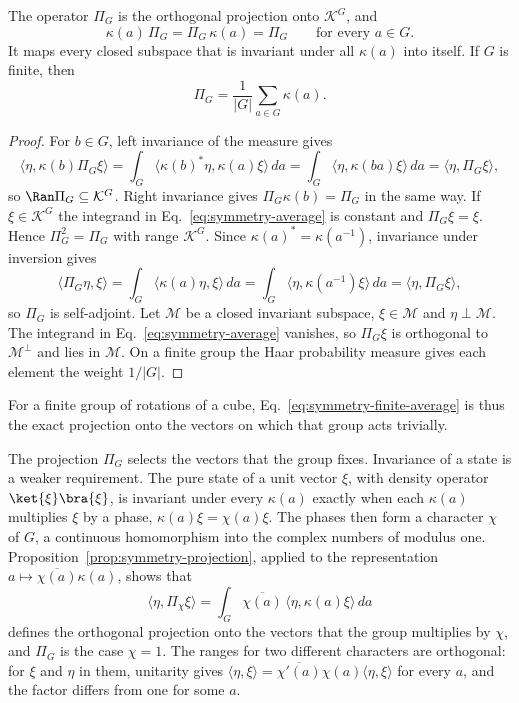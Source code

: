 \begin{proposition}
\label{prop:symmetry-projection}
The operator $\Pi_G$ is the orthogonal projection onto $\mathcal K^G$, and
\begin{equation}
 \kappa(a)\,\Pi_G=\Pi_G\,\kappa(a)=\Pi_G\qquad\text{for every }a\in G .
 \label{eq:symmetry-absorption}
\end{equation}
It maps every closed subspace that is invariant under all $\kappa(a)$ into itself. If $G$ is finite, then
\begin{equation}
 \Pi_G=\frac1{|G|}\sum_{a\in G}\kappa(a).
 \label{eq:symmetry-finite-average}
\end{equation}
\end{proposition}
\begin{proof}
For $b\in G$, left invariance of the measure gives
\[
 \langle\eta,\kappa(b)\Pi_G\xi\rangle=\int_G\langle\kappa(b)^*\eta,\kappa(a)\xi\rangle\,da
   =\int_G\langle\eta,\kappa(ba)\xi\rangle\,da=\langle\eta,\Pi_G\xi\rangle ,
\]
so $\Ran\Pi_G\subseteq\mathcal K^G$. Right invariance gives $\Pi_G\kappa(b)=\Pi_G$ in the same way. If $\xi\in\mathcal K^G$ the integrand in Eq.~\eqref{eq:symmetry-average} is constant and $\Pi_G\xi=\xi$. Hence $\Pi_G^2=\Pi_G$ with range $\mathcal K^G$. Since $\kappa(a)^*=\kappa(a^{-1})$, invariance under inversion gives
\[
 \langle\Pi_G\eta,\xi\rangle=\int_G\langle\kappa(a)\eta,\xi\rangle\,da
   =\int_G\langle\eta,\kappa(a^{-1})\xi\rangle\,da=\langle\eta,\Pi_G\xi\rangle ,
\]
so $\Pi_G$ is self-adjoint. Let $\mathcal M$ be a closed invariant subspace, $\xi\in\mathcal M$ and $\eta\perp\mathcal M$. The integrand in Eq.~\eqref{eq:symmetry-average} vanishes, so $\Pi_G\xi$ is orthogonal to $\mathcal M^\perp$ and lies in $\mathcal M$. On a finite group the Haar probability measure gives each element the weight $1/|G|$.
\end{proof}

For a finite group of rotations of a cube, Eq.~\eqref{eq:symmetry-finite-average} is thus the exact projection onto the vectors on which that group acts trivially.

The projection $\Pi_G$ selects the vectors that the group fixes. Invariance of a state is a weaker requirement. The pure state of a unit vector $\xi$, with density operator $\ket{\xi}\bra{\xi}$, is invariant under every $\kappa(a)$ exactly when each $\kappa(a)$ multiplies $\xi$ by a phase, $\kappa(a)\xi=\chi(a)\xi$. The phases then form a character $\chi$ of $G$, a continuous homomorphism into the complex numbers of modulus one. Proposition~\ref{prop:symmetry-projection}, applied to the representation $a\mapsto\overline{\chi(a)}\kappa(a)$, shows that
\begin{equation}
 \langle\eta,\Pi_\chi\xi\rangle=\int_G\overline{\chi(a)}\,\langle\eta,\kappa(a)\xi\rangle\,da
 \label{eq:symmetry-character-projection}
\end{equation}
defines the orthogonal projection onto the vectors that the group multiplies by $\chi$, and $\Pi_G$ is the case $\chi=1$. The ranges for two different characters are orthogonal: for $\xi$ and $\eta$ in them, unitarity gives $\langle\eta,\xi\rangle=\overline{\chi'(a)}\chi(a)\langle\eta,\xi\rangle$ for every $a$, and the factor differs from one for some $a$.

